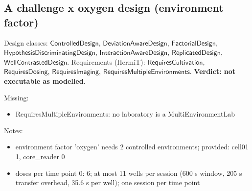 \documentclass[10pt,a4paper]{article}
\begin{document}
\subsection*{A challenge x oxygen design (environment factor)}
Design classes: $\mathsf{ControlledDesign}$, $\mathsf{DeviationAwareDesign}$, $\mathsf{FactorialDesign}$, $\mathsf{HypothesisDiscriminatingDesign}$, $\mathsf{InteractionAwareDesign}$, $\mathsf{ReplicatedDesign}$, $\mathsf{WellContrastedDesign}$. Requirements (HermiT): $\mathsf{RequiresCultivation}$, $\mathsf{RequiresDosing}$, $\mathsf{RequiresImaging}$, $\mathsf{RequiresMultipleEnvironments}$. \textbf{Verdict: \textcolor{red!65!black}{not executable as modelled}}.
\par{}
Missing:\begin{itemize}[nosep]\item RequiresMultipleEnvironments: no laboratory is a MultiEnvironmentLab\end{itemize}
Notes:\begin{itemize}[nosep]\item environment factor 'oxygen' needs 2 controlled environments; provided: cell01 1, core\_reader 0\item doses per time point {0: 6}; at most 11 wells per session (600 s window, 205 s transfer overhead, 35.6 s per well); one session per time point\end{itemize}
\end{document}
